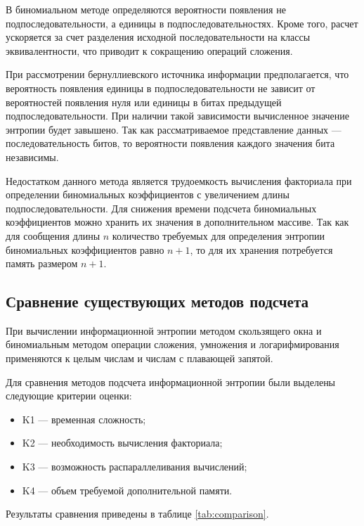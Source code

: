 В биномиальном методе определяются вероятности появления не подпоследовательности, а единицы в подпоследовательностях. Кроме того, расчет ускоряется за счет разделения исходной последовательности на классы эквивалентности, что приводит к сокращению операций сложения.

При рассмотрении бернуллиевского источника информации предполагается, что вероятность появления единицы в подпоследовательности не зависит от вероятностей появления нуля или единицы в битах предыдущей подпоследовательности. При наличии такой зависимости вычисленное значение энтропии будет завышено. Так как рассматриваемое представление данных --- последовательность битов, то вероятности появления каждого значения бита независимы. 

Недостатком данного метода является трудоемкость вычисления факториала при определении биномиальных коэффициентов с увеличением длины подпоследовательности. Для снижения времени подсчета биномиальных коэффициентов можно хранить их значения в дополнительном массиве. Так как для сообщения длины $n$ количество требуемых для определения энтропии биномиальных коэффициентов равно $n + 1$, то для их хранения потребуется память размером $n + 1$.

\subsection{Сравнение существующих методов подсчета}

При вычислении информационной энтропии методом скользящего окна и биномиальным методом операции сложения, умножения и логарифмирования применяются к целым числам и числам с плавающей запятой.

Для сравнения методов подсчета информационной энтропии были выделены следующие критерии оценки:

\begin{itemize}
	\item K1 --- временная сложность;
	\item K2 --- необходимость вычисления факториала;
	\item K3 --- возможность распараллеливания вычислений;
	\item K4 --- объем требуемой дополнительной памяти.
\end{itemize}

Результаты сравнения приведены в таблице \ref{tab:comparison}.

